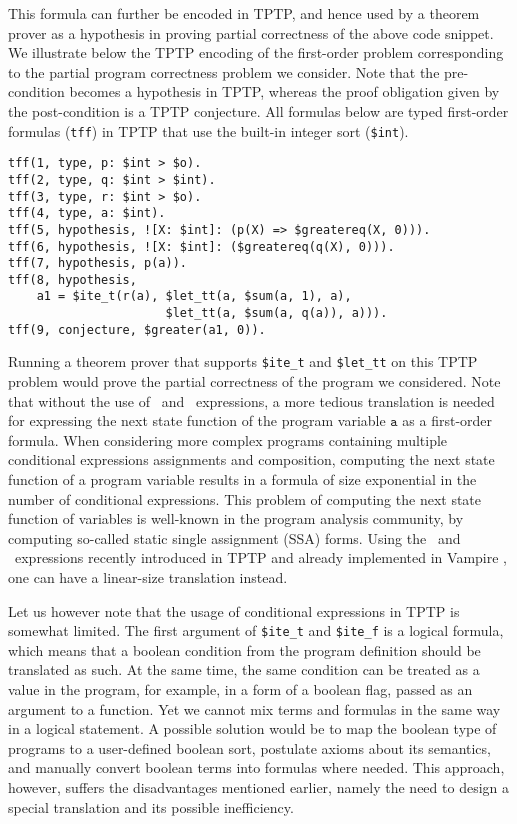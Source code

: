 This formula can further be encoded in TPTP, and hence used by a theorem prover as a hypothesis in proving partial correctness of the above code snippet. We illustrate below the TPTP encoding of the first-order problem corresponding to the partial program correctness problem we consider.  Note that the pre-condition becomes a hypothesis in TPTP, whereas the proof obligation given by the post-condition is a TPTP conjecture. All formulas below are typed first-order formulas (\lstinline'tff') in TPTP that use the built-in integer sort (\lstinline'$int').
\begin{lstlisting}[language=tptp]
tff(1, type, p: $int > $o).
tff(2, type, q: $int > $int).
tff(3, type, r: $int > $o).
tff(4, type, a: $int).
tff(5, hypothesis, ![X: $int]: (p(X) => $greatereq(X, 0))).
tff(6, hypothesis, ![X: $int]: ($greatereq(q(X), 0))).
tff(7, hypothesis, p(a)).
tff(8, hypothesis,
    a1 = $ite_t(r(a), $let_tt(a, $sum(a, 1), a),
                      $let_tt(a, $sum(a, q(a)), a))).
tff(9, conjecture, $greater(a1, 0)).
\end{lstlisting}

Running a theorem prover that supports \lstinline'$ite_t' and \lstinline'$let_tt' on this TPTP problem would prove the partial correctness of the program we considered. Note that without the use of \ITE\ and \LETIN\ expressions, a more tedious translation is needed for expressing the next state function of the program variable $\mathtt{a}$ as a first-order formula. When considering more complex programs containing multiple conditional expressions assignments and composition,
computing the next state function of a program variable results in a formula of size exponential in the number of conditional expressions. This problem of computing the next state function of variables is well-known in the program analysis community, by computing so-called static single assignment (SSA) forms. Using the \ITE\ and \LETIN\ expressions recently introduced in TPTP and already implemented in Vampire \cite{PSI14}, one can have a linear-size translation instead.

Let us however note that the usage of conditional expressions in TPTP is somewhat limited. The first argument of \lstinline'$ite_t' and \lstinline'$ite_f' is a logical formula, which means that a boolean condition from the program definition should be translated as such. At the same time, the same condition can be treated as a value in the program, for example, in a form of a boolean flag, passed as an argument to a function. Yet we cannot mix terms and formulas in the same way in a logical statement.
A possible solution would be to map the boolean type of programs to a user-defined boolean sort, postulate axioms about its semantics, and manually convert boolean terms into formulas where needed. This approach, however, suffers the disadvantages mentioned earlier, namely the need to design a special translation and its possible inefficiency.


